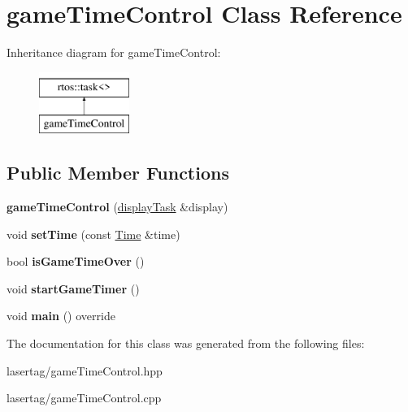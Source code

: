 \hypertarget{classgame_time_control}{}\section{game\+Time\+Control Class Reference}
\label{classgame_time_control}
Inheritance diagram for game\+Time\+Control\+:\begin{figure}[H]
\begin{center}
\leavevmode
\includegraphics[height=2.000000cm]{classgame_time_control}
\end{center}
\end{figure}
\subsection*{Public Member Functions}
\begin{DoxyCompactItemize}
\item 
\mbox{\label{classgame_time_control_a2401d43b6f5e68a806ff5190ddb2d307}} 
{\bfseries game\+Time\+Control} (\mbox{\hyperlink{classdisplay_task}{display\+Task}} \&display)
\item 
\mbox{\label{classgame_time_control_afb183d1589a21fdea5719cb266fb8abf}} 
void {\bfseries set\+Time} (const \mbox{\hyperlink{class_time}{Time}} \&time)
\item 
\mbox{\label{classgame_time_control_ac2f9139297b5a62c68378663e269ab90}} 
bool {\bfseries is\+Game\+Time\+Over} ()
\item 
\mbox{\label{classgame_time_control_a21f29648cd0ac087aaa3ee278a4afef3}} 
void {\bfseries start\+Game\+Timer} ()
\item 
\mbox{\label{classgame_time_control_af81f8e6475d4ab3fdb8463013578d12d}} 
void {\bfseries main} () override
\end{DoxyCompactItemize}


The documentation for this class was generated from the following files\+:\begin{DoxyCompactItemize}
\item 
lasertag/game\+Time\+Control.\+hpp\item 
lasertag/game\+Time\+Control.\+cpp\end{DoxyCompactItemize}
